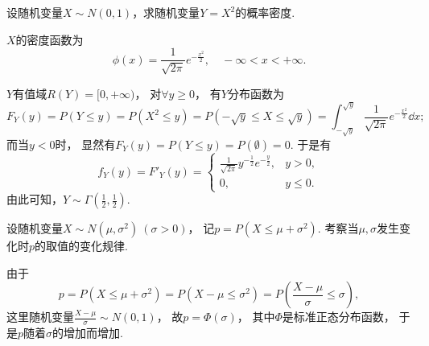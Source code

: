 \begin{example}
设随机变量\(X \sim N(0,1)\)，求随机变量\(Y = X^2\)的概率密度.
\begin{solution}
\(X\)的密度函数为\begin{equation*}
	\phi(x) = \frac{1}{\sqrt{2\pi}} e^{-\frac{x^2}{2}},
	\quad -\infty < x < +\infty.
\end{equation*}

\(Y\)有值域\(R(Y) = [0,+\infty)\)，
对\(\forall y \geq 0\)，
有\(Y\)分布函数为\begin{equation*}
	F_Y(y) = P(Y \leq y) = P(X^2 \leq y)
	= P(-\sqrt{y} \leq X \leq \sqrt{y})
	= \int_{-\sqrt{y}}^{\sqrt{y}}{\frac{1}{\sqrt{2\pi}} e^{-\frac{x^2}{2}} \dd{x}};
\end{equation*}
而当\(y < 0\)时，
显然有\(F_Y(y) = P(Y \leq y) = P(\emptyset) = 0\).
于是有\begin{equation*}
	f_Y(y)
	= F'_Y(y)
	= \left\{ \begin{array}{ll}
		\frac{1}{\sqrt{2\pi}} y^{-\frac{1}{2}} e^{-\frac{y}{2}}, & y > 0, \\
		0, & y \leq 0.
	\end{array} \right.
\end{equation*}
由此可知，\(Y \sim \Gamma\left(\frac{1}{2},\frac{1}{2}\right)\).
\end{solution}
\end{example}

\begin{example}
设随机变量\(X \sim N(\mu,\sigma^2)\ (\sigma>0)\)，
记\(p = P(X \leq \mu + \sigma^2)\).
考察当\(\mu,\sigma\)发生变化时\(p\)的取值的变化规律.
\begin{solution}
由于\begin{equation*}
	p = P(X \leq \mu + \sigma^2)
	= P(X - \mu \leq \sigma^2)
	= P\left( \frac{X-\mu}\sigma \leq \sigma \right),
\end{equation*}
这里随机变量\(\frac{X-\mu}\sigma \sim N(0,1)\)，
故\(p = \Phi(\sigma)\)，
其中\(\Phi\)是标准正态分布函数，
于是\(p\)随着\(\sigma\)的增加而增加.
\end{solution}
\end{example}

